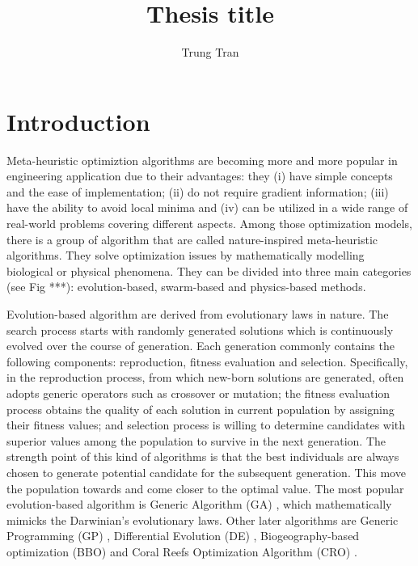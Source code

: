 \documentclass[a4paper,13pt,2p]{report}
\begin{document}
\setlength{\abovedisplayskip}{3pt}
\setlength{\belowdisplayskip}{3pt}

\title{\LARGE {\bf Thesis title}\\
}

\author{Trung Tran}

\normallinespacing
\maketitle


\body

\chapter{Introduction}
\label{ch:introduction}

	Meta-heuristic optimiztion algorithms are becoming more and more popular in engineering application due to their advantages: they (i) have simple concepts and the ease of implementation; (ii) do not require gradient information; (iii) have the ability to avoid local minima and (iv) can be utilized in a wide range of real-world problems covering different aspects. Among those optimization models, there is a group of algorithm that are called nature-inspired meta-heuristic algorithms. They solve optimization issues by mathematically modelling biological or physical phenomena. They can be divided into three main categories (see Fig ***): evolution-based, swarm-based and physics-based methods. 
	
	Evolution-based algorithm are derived from evolutionary laws in nature. The search process starts with randomly generated solutions which is continuously evolved over the course of generation. Each generation commonly contains the following components: reproduction, fitness evaluation and selection. Specifically, in the reproduction process, from which new-born solutions are generated, often adopts generic operators such as crossover or mutation; the fitness evaluation process obtains the quality of each solution in current population by assigning their fitness values; and selection process is willing to determine candidates with superior values among the population to survive in the next generation. The strength point of this kind of algorithms is that the best individuals are always chosen to generate potential candidate for the subsequent generation. This move the population towards and come closer to the optimal value. The most popular evolution-based algorithm is Generic Algorithm (GA) \cite{holland1992genetic}, which mathematically mimicks the Darwinian's evolutionary laws. Other later algorithms are Generic Programming (GP) \cite{koza1997genetic}, Differential Evolution (DE) \cite{fleetwood2004introduction}, Biogeography-based optimization (BBO) \cite{simon2008biogeography} and Coral Reefs Optimization Algorithm (CRO) \cite{salcedo2013novel}. 
	
\end{document}
